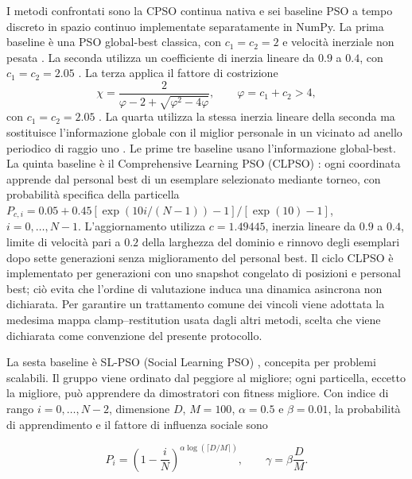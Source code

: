 I metodi confrontati sono la CPSO continua nativa e sei baseline PSO a tempo
discreto in spazio continuo implementate separatamente in NumPy. La prima baseline è una PSO global-best
classica, con $c_1=c_2=2$ e velocità inerziale non pesata
\citep{Kennedy1995}. La seconda utilizza un coefficiente di inerzia lineare da
$0.9$ a $0.4$, con $c_1=c_2=2.05$ \citep{ShiEberhart1998}. La terza applica il
fattore di costrizione
\begin{equation}
  \chi=\frac{2}{\varphi-2+\sqrt{\varphi^2-4\varphi}},
  \qquad \varphi=c_1+c_2>4,
  \label{eq:constriction-baseline}
\end{equation}
con $c_1=c_2=2.05$ \citep{Clerc2002}. La quarta utilizza la stessa inerzia
lineare della seconda ma sostituisce l'informazione globale con il miglior
personale in un vicinato ad anello periodico di raggio uno
\citep{KennedyMendes2002}. Le prime tre baseline usano l'informazione
global-best. La quinta baseline è il Comprehensive Learning PSO (CLPSO)
\citep{Liang2006CLPSO}: ogni coordinata apprende dal personal best di un
esemplare selezionato mediante torneo, con probabilità specifica della
particella $P_{c,i}=0.05+0.45[\exp(10i/(N-1))-1]/[\exp(10)-1]$,
$i=0,\ldots,N-1$. L'aggiornamento utilizza $c=1.49445$, inerzia lineare da
$0.9$ a $0.4$, limite di velocità pari a $0.2$ della larghezza del dominio e
rinnovo degli esemplari dopo sette generazioni senza miglioramento del personal
best. Il ciclo CLPSO è implementato per generazioni con uno snapshot congelato di
posizioni e personal best; ciò evita che l'ordine di valutazione induca una
dinamica asincrona non dichiarata. Per garantire un trattamento comune dei
vincoli viene adottata la medesima mappa clamp--restitution usata dagli altri
metodi, scelta che viene dichiarata come convenzione del presente protocollo.

La sesta baseline è SL-PSO (Social Learning PSO)
\citep{ChengJin2015SLPSO}, concepita per problemi scalabili. Il gruppo viene
ordinato dal peggiore al migliore; ogni particella, eccetto la migliore, può
apprendere da dimostratori con fitness migliore. Con indice di rango
$i=0,\ldots,N-2$, dimensione $D$, $M=100$, $\alpha=0.5$ e $\beta=0.01$,
la probabilità di apprendimento e il fattore di influenza sociale sono

\begin{equation}
 P_i=\left(1-\frac{i}{N}\right)^{\alpha\log(\lceil D/M\rceil)},
 \qquad \gamma=\beta\frac{D}{M}.
 \label{eq:slpso-learning}
\end{equation}

